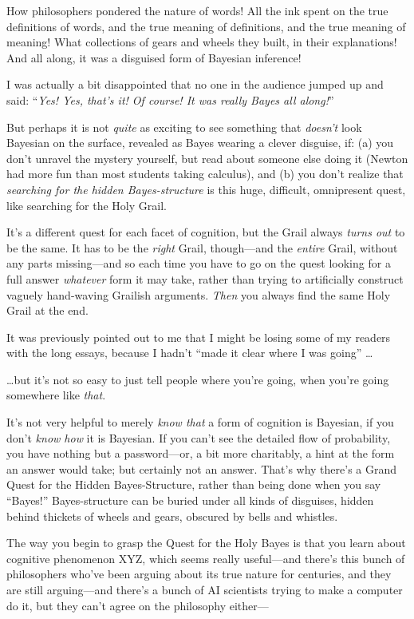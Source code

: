 {
 How philosophers pondered the nature of words! All the ink spent
on the true definitions of words, and the true meaning of definitions,
and the true meaning of meaning! What collections of gears and wheels
they built, in their explanations! And all along, it was a disguised
form of Bayesian inference!}

{
 I was actually a bit disappointed that no one in the audience
jumped up and said: ``\textit{Yes! Yes,
that's it! Of course! It was really Bayes all
along!}''}

{
 But perhaps it is not \textit{quite} as exciting to see something
that \textit{doesn't} look Bayesian on the surface,
revealed as Bayes wearing a clever disguise, if: (a) you
don't unravel the mystery yourself, but read about
someone else doing it (Newton had more fun than most students taking
calculus), and (b) you don't realize that
\textit{searching for the hidden Bayes-structure} is this huge,
difficult, omnipresent quest, like searching for the Holy Grail.}

{
 It's a different quest for each facet of
cognition, but the Grail always \textit{turns out} to be the same. It
has to be the \textit{right} Grail, though---and the \textit{entire}
Grail, without any parts missing---and so each time you have to go on
the quest looking for a full answer \textit{whatever} form it may take,
rather than trying to artificially construct vaguely hand-waving
Grailish arguments. \textit{Then} you always find the same Holy Grail
at the end.}

{
 It was previously pointed out to me that I might be losing some of
my readers with the long essays, because I hadn't
``made it clear where I was going''
\ldots}

{
 \ldots but it's not so easy to just tell people
where you're going, when you're going
somewhere like \textit{that}.}

{
 It's not very helpful to merely \textit{know that}
a form of cognition is Bayesian, if you don't
\textit{know how} it is Bayesian. If you can't see the
detailed flow of probability, you have nothing but a password---or, a
bit more charitably, a hint at the form an answer would take; but
certainly not an answer. That's why
there's a Grand Quest for the Hidden Bayes-Structure,
rather than being done when you say
``Bayes!'' Bayes-structure can be
buried under all kinds of disguises, hidden behind thickets of wheels
and gears, obscured by bells and whistles.}

{
 The way you begin to grasp the Quest for the Holy Bayes is that
you learn about cognitive phenomenon XYZ, which seems really
useful---and there's this bunch of philosophers
who've been arguing about its true nature for
centuries, and they are still arguing---and there's a
bunch of AI scientists trying to make a computer do it, but they
can't agree on the philosophy either---}

